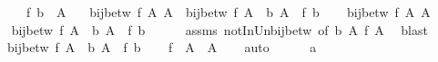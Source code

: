 \begin{isabellebody}
\ \ \ \ \ {\isachardoublequoteopen}f\ b\ {\isasymnotin}\ A{\isacharprime}{\kern0pt}{\isachardoublequoteclose}\isanewline
\ \ \ {\isachardoublequoteopen}bij{\isacharunderscore}{\kern0pt}betw\ f\ A\ A{\isacharprime}{\kern0pt}\ {\isacharequal}{\kern0pt}\ bij{\isacharunderscore}{\kern0pt}betw\ f\ {\isacharparenleft}{\kern0pt}A\ {\isasymunion}\ {\isacharbraceleft}{\kern0pt}b{\isacharbraceright}{\kern0pt}{\isacharparenright}{\kern0pt}\ {\isacharparenleft}{\kern0pt}A{\isacharprime}{\kern0pt}\ {\isasymunion}\ {\isacharbraceleft}{\kern0pt}f\ b{\isacharbraceright}{\kern0pt}{\isacharparenright}{\kern0pt}{\isachardoublequoteclose}\isanewline
%
\isadelimproof
%
\endisadelimproof
%
\isatagproof
{}\isamarkupfalse%
\isanewline
\ \ \isamarkupfalse%
\ {\isachardoublequoteopen}bij{\isacharunderscore}{\kern0pt}betw\ f\ A\ A{\isacharprime}{\kern0pt}{\isachardoublequoteclose}\isanewline
\ \ \isamarkupfalse%
\ \isamarkupfalse%
\ {\isachardoublequoteopen}bij{\isacharunderscore}{\kern0pt}betw\ f\ {\isacharparenleft}{\kern0pt}A\ {\isasymunion}\ {\isacharbraceleft}{\kern0pt}b{\isacharbraceright}{\kern0pt}{\isacharparenright}{\kern0pt}\ {\isacharparenleft}{\kern0pt}A{\isacharprime}{\kern0pt}\ {\isasymunion}\ {\isacharbraceleft}{\kern0pt}f\ b{\isacharbraceright}{\kern0pt}{\isacharparenright}{\kern0pt}{\isachardoublequoteclose}\isanewline
\ \ \ \ \isamarkupfalse%
\ assms\ notIn{\isacharunderscore}{\kern0pt}Un{\isacharunderscore}{\kern0pt}bij{\isacharunderscore}{\kern0pt}betw\ {\isacharbrackleft}{\kern0pt}of\ b\ A\ f\ A{\isacharprime}{\kern0pt}{\isacharbrackright}{\kern0pt}\ \isamarkupfalse%
\ blast\isanewline
{}\isamarkupfalse%
\isanewline
\ \ \isamarkupfalse%
\ {\isacharasterisk}{\kern0pt}{\isacharcolon}{\kern0pt}\ {\isachardoublequoteopen}bij{\isacharunderscore}{\kern0pt}betw\ f\ {\isacharparenleft}{\kern0pt}A\ {\isasymunion}\ {\isacharbraceleft}{\kern0pt}b{\isacharbraceright}{\kern0pt}{\isacharparenright}{\kern0pt}\ {\isacharparenleft}{\kern0pt}A{\isacharprime}{\kern0pt}\ {\isasymunion}\ {\isacharbraceleft}{\kern0pt}f\ b{\isacharbraceright}{\kern0pt}{\isacharparenright}{\kern0pt}{\isachardoublequoteclose}\isanewline
\ \ \isamarkupfalse%
\ {\isachardoublequoteopen}f\ {\isacharbackquote}{\kern0pt}\ A\ {\isacharequal}{\kern0pt}\ A{\isacharprime}{\kern0pt}{\isachardoublequoteclose}\isanewline
\ \ \isamarkupfalse%
\ auto\isanewline
\ \ \ \ \isamarkupfalse%
\ a\isanewline

\end{isabellebody}

